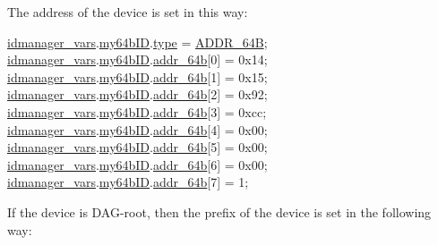 The address of the device is set in this way\+: 
\begin{DoxyCodeInclude}
   \hyperlink{idmanager_8c_a3b050a996ba4875e4327fb81fbb18c5b}{idmanager\_vars}.\hyperlink{structidmanager__vars__t_a41c964b52056d4022c136419ab5d0704}{my64bID}.\hyperlink{structopen__addr__t_a2abdbb15dedda5606521852a4b4fc0ba}{type}         = \hyperlink{opendefs_8h_a52864abcf6ebd8d120995b36fe6ce06eaaca0da977da87a831efebdda8b376fa1}{ADDR\_64B};
   \hyperlink{idmanager_8c_a3b050a996ba4875e4327fb81fbb18c5b}{idmanager\_vars}.\hyperlink{structidmanager__vars__t_a41c964b52056d4022c136419ab5d0704}{my64bID}.\hyperlink{structopen__addr__t_a7ca9b0c966447d191c6f05e375571231}{addr\_64b}[0]   = 0x14;
   \hyperlink{idmanager_8c_a3b050a996ba4875e4327fb81fbb18c5b}{idmanager\_vars}.\hyperlink{structidmanager__vars__t_a41c964b52056d4022c136419ab5d0704}{my64bID}.\hyperlink{structopen__addr__t_a7ca9b0c966447d191c6f05e375571231}{addr\_64b}[1]   = 0x15;
   \hyperlink{idmanager_8c_a3b050a996ba4875e4327fb81fbb18c5b}{idmanager\_vars}.\hyperlink{structidmanager__vars__t_a41c964b52056d4022c136419ab5d0704}{my64bID}.\hyperlink{structopen__addr__t_a7ca9b0c966447d191c6f05e375571231}{addr\_64b}[2]   = 0x92;
   \hyperlink{idmanager_8c_a3b050a996ba4875e4327fb81fbb18c5b}{idmanager\_vars}.\hyperlink{structidmanager__vars__t_a41c964b52056d4022c136419ab5d0704}{my64bID}.\hyperlink{structopen__addr__t_a7ca9b0c966447d191c6f05e375571231}{addr\_64b}[3]   = 0xcc;
   \hyperlink{idmanager_8c_a3b050a996ba4875e4327fb81fbb18c5b}{idmanager\_vars}.\hyperlink{structidmanager__vars__t_a41c964b52056d4022c136419ab5d0704}{my64bID}.\hyperlink{structopen__addr__t_a7ca9b0c966447d191c6f05e375571231}{addr\_64b}[4]   = 0x00;
   \hyperlink{idmanager_8c_a3b050a996ba4875e4327fb81fbb18c5b}{idmanager\_vars}.\hyperlink{structidmanager__vars__t_a41c964b52056d4022c136419ab5d0704}{my64bID}.\hyperlink{structopen__addr__t_a7ca9b0c966447d191c6f05e375571231}{addr\_64b}[5]   = 0x00;
   \hyperlink{idmanager_8c_a3b050a996ba4875e4327fb81fbb18c5b}{idmanager\_vars}.\hyperlink{structidmanager__vars__t_a41c964b52056d4022c136419ab5d0704}{my64bID}.\hyperlink{structopen__addr__t_a7ca9b0c966447d191c6f05e375571231}{addr\_64b}[6]   = 0x00;
   \hyperlink{idmanager_8c_a3b050a996ba4875e4327fb81fbb18c5b}{idmanager\_vars}.\hyperlink{structidmanager__vars__t_a41c964b52056d4022c136419ab5d0704}{my64bID}.\hyperlink{structopen__addr__t_a7ca9b0c966447d191c6f05e375571231}{addr\_64b}[7]   = 1;
\end{DoxyCodeInclude}
 If the device is D\+A\+G-\/root, then the prefix of the device is set in the following way\+: 
